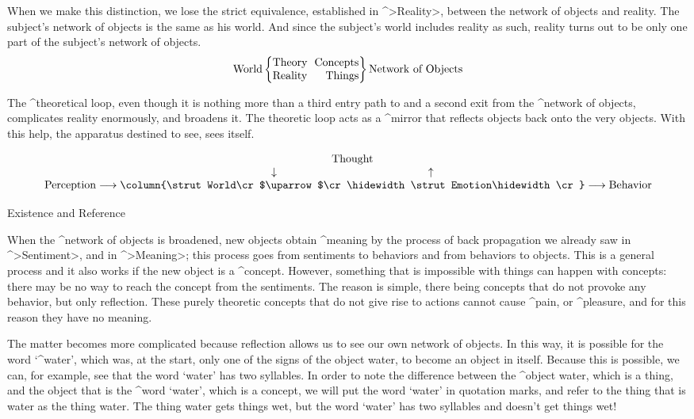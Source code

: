 When we make this distinction, we lose the strict equivalence,
established in ^>Reality>, between the network of objects and reality.
The subject's network of objects is the same as his world. And since the
subject's world includes reality as such, reality turns out to be only
one part of the subject's network of objects.
\abovedisplayskip=24pt
$$\hbox{World} \left\{ \vcenter{\def\:{\hskip0.65em}\halign{#\cr
    Theory\:\hfil Concepts\cr
    Reality\:\hfil Things\cr} } \right\}
  \hbox{Network of Objects}$$
\abovedisplayskip=12pt

The ^{theoretical loop}, even though it is nothing more than a third
entry path to and a second exit from the ^{network of objects},
complicates reality enormously, and broadens it. The theoretic loop acts
as a ^{mirror} that reflects objects back onto the very objects. With
this help, the apparatus destined to see, sees itself.

\vfill\break

\beginpoints
$$\hbox{Perception}\longrightarrow
   \vbox{\everycr={}\tabskip=0pt \lineskip=0pt
    \halign{\hfil\strut#\hfil\cr
     \hidewidth Thought\hidewidth\cr
     $\downarrow$\hfil$\uparrow$\cr
     \column{\strut World\cr$\uparrow$\cr
      \hidewidth\strut Emotion\hidewidth\cr}\cr}}
  \longrightarrow\hbox{Behavior}$$
\endpoints

\Section Existence and Reference

When the ^{network of objects} is broadened, new objects obtain
^{meaning} by the process of back propagation we already saw in
^>Sentiment>, and in ^>Meaning>; this process goes from sentiments to
behaviors and from behaviors to objects. This is a general process and
it also works if the new object is a ^{concept}. However, something that
is impossible with things can happen with concepts: there may be no way
to reach the concept from the sentiments. The reason is simple, there
being concepts that do not provoke any behavior, but only reflection.
These purely theoretic concepts that do not give rise to actions cannot
cause ^{pain}, or ^{pleasure}, and for this reason they have no meaning.

The matter becomes more complicated because reflection allows us to see
our own network of objects. In this way, it is possible for the word
`^{water}', which was, at the start, only one of the signs of the object
water, to become an object in itself. Because this is possible, we can,
for example, see that the word `water' has two syllables. In order to
note the difference between the ^{object} water, which is a thing, and
the object that is the ^{word} `water', which is a concept, we will put
the word `water' in quotation marks, and refer to the thing that is
water as the thing water. The thing water gets things wet, but the word
`water' has two syllables and doesn't get things wet!

